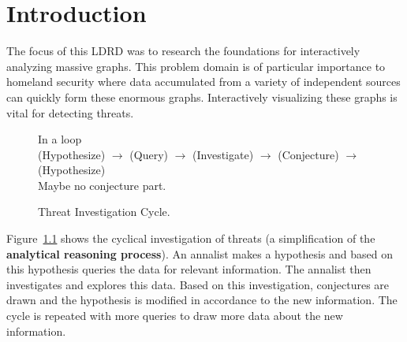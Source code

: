 \documentclass[pdf,12pt,report,strict]{SANDreport}
\newcommand*{\keyterm}[1]{\textbf{#1}}
\begin{document}


% 
\SANDmain		%

\chapter{Introduction}
\label{chap:Introduction}

The focus of this LDRD was to research the foundations for interactively
analyzing massive graphs.  This problem domain is of particular importance
to homeland security where data accumulated from a variety of independent
sources can quickly form these enormous graphs.  Interactively visualizing
these graphs is vital for detecting threats.

\begin{figure}
  \centering
  In a loop \\
  (Hypothesize) $\rightarrow$ (Query) $\rightarrow$ (Investigate)
  $\rightarrow$ (Conjecture) $\rightarrow$ (Hypothesize)
  \\
  Maybe no conjecture part.
  \caption{Threat Investigation Cycle.}
  \label{fig:ThreatInvestigationCycle}
\end{figure}

Figure~\ref{fig:ThreatInvestigationCycle} shows the cyclical investigation
of threats (a simplification of the
\keyterm{analytical reasoning
process}\cite{Thomas05}).  An annalist makes a hypothesis and based on this
hypothesis queries the data for relevant information.  The annalist then
investigates and explores this data.  Based on this investigation,
conjectures are drawn and the hypothesis is modified in accordance to the
new information.  The cycle is repeated with more queries to draw more data
about the new information.
\end{document}
